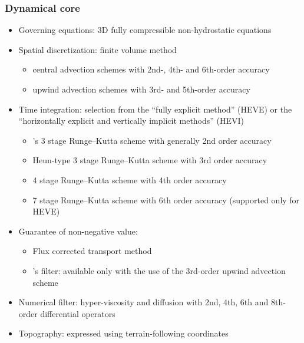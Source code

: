 \subsubsection{Dynamical core}
\begin{itemize}
 \item Governing equations: 3D fully compressible non-hydrostatic equations
 \item Spatial discretization: finite volume method
    \begin{itemize}
      \item central advection schemes with 2nd-, 4th- and 6th-order accuracy
      \item upwind advection schemes with 3rd- and 5th-order accuracy
    \end{itemize}
 \item Time integration: selection from the ``fully explicit method'' (HEVE)
   or the ``horizontally explicit and vertically implicit methods'' (HEVI)
    \begin{itemize}
      \item \citet{Wicker_2002}'s 3 stage Runge--Kutta scheme with generally 2nd order accuracy
      \item Heun-type 3 stage Runge--Kutta scheme with 3rd order accuracy
      \item 4 stage Runge--Kutta scheme with 4th order accuracy
      \item 7 stage Runge--Kutta scheme with 6th order accuracy (supported only for HEVE)
    \end{itemize}
 \item Guarantee of non-negative value:
    \begin{itemize}
      \item Flux corrected transport method \citep{zalesak_1979}
      \item \citet{Koren_1993}'s filter: available only with the use of the 3rd-order upwind advection scheme
    \end{itemize}
 \item Numerical filter: hyper-viscosity and diffusion with 2nd, 4th, 6th and 8th-order differential operators 
 \item Topography: expressed using terrain-following coordinates
\end{itemize}


